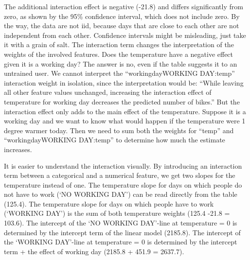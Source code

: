 \documentclass[12pt,]{krantz}
\begin{document}
The additional interaction effect is negative (-21.8) and differs
significantly from zero, as shown by the 95\% confidence interval, which
does not include zero. By the way, the data are not iid, because days
that are close to each other are not independent from each other.
Confidence intervals might be misleading, just take it with a grain of
salt. The interaction term changes the interpretation of the weights of
the involved features. Does the temperature have a negative effect given
it is a working day? The answer is no, even if the table suggests it to
an untrained user. We cannot interpret the ``workingdayWORKING
DAY:temp'' interaction weight in isolation, since the interpretation
would be: ``While leaving all other feature values unchanged, increasing
the interaction effect of temperature for working day decreases the
predicted number of bikes.'' But the interaction effect only adds to the
main effect of the temperature. Suppose it is a working day and we want
to know what would happen if the temperature were 1 degree warmer today.
Then we need to sum both the weights for ``temp'' and
``workingdayWORKING DAY:temp'' to determine how much the estimate
increases.

It is easier to understand the interaction visually. By introducing an
interaction term between a categorical and a numerical feature, we get
two slopes for the temperature instead of one. The temperature slope for
days on which people do not have to work (`NO WORKING DAY') can be read
directly from the table (125.4). The temperature slope for days on which
people have to work (`WORKING DAY') is the sum of both temperature
weights (125.4 -21.8 = 103.6). The intercept of the `NO WORKING
DAY'-line at temperature = 0 is determined by the intercept term of the
linear model (2185.8). The intercept of the `WORKING DAY'-line at
temperature = 0 is determined by the intercept term + the effect of
working day (2185.8 + 451.9 = 2637.7).
\end{document}
